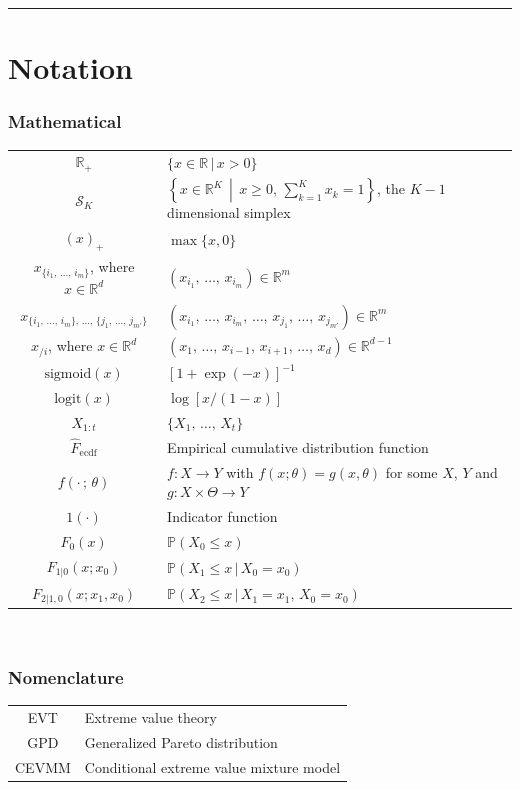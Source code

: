 \documentclass[11pt,twoside,openany]{book}
\newcommand{\prob}{\mathbb{P}}
\newcommand{\reals}{\mathbb{R}}
\numberwithin{Theorem}{chapter}
\numberwithin{Definition}{chapter}
\numberwithin{Lemma}{chapter}
\numberwithin{Algorithm}{chapter}
\numberwithin{equation}{chapter}
\begin{document}
\setcounter{page}{1}

\thispagestyle{plain}
\tableofcontents
\clearpage

\thispagestyle{plain}
\hrule
\chapter*{Notation}

\subsection*{Mathematical}
\begin{tabular}{cp{\textwidth}}
  $\reals_{+}$ & $\{x\in\reals\,|\,x > 0\}$ \\
  $\mathcal{S}_K$ & $\left\{x\in\reals^K\,\middle |\, x \geq 0,\,\sum_{k=1}^K x_k = 1\right\}$, the $K-1$ dimensional simplex \\
  $(x)_+$ & $\max\{x, 0\}$ \\
  $x_{\{i_1,\,\ldots,\,i_m\}}$, where $x\in\reals^d$ & $(x_{i_1},\,\ldots,\,x_{i_m})\in\reals^m$ \\
  $x_{\{i_1,\,\ldots,\,i_{m}\},\,\ldots,\,\{j_{1},\,\ldots,\,j_{m'}\}}$ & $(x_{i_1},\,\ldots,\,x_{i_m},\,\ldots,\,x_{j_{1}},\,\ldots,\,x_{j_{m'}})\in\reals^m$ \\
  $x_{/i}$, where $x\in\reals^d$ & $(x_1,\,\ldots,\,x_{i-1},\,x_{i+1},\,\ldots,\,x_d)\in\reals^{d-1}$ \\
  $\text{sigmoid}(x)$ & $[1 + \exp(-x)]^{-1}$ \\
  $\text{logit}(x)$ & $\log\left[x/(1-x)\right]$ \\
  $X_{1:t}$ & $\{X_1,\,\ldots,\,X_t\}$ \\
  $\hat F_{\text{ecdf}}$ & Empirical cumulative distribution function \\
  $f(\cdot\,;\,\theta)$ & $f:X\rightarrow Y$ with $f(x;\theta) = g(x,\theta)$ for some $X$, $Y$ and $g : X \times \Theta \rightarrow Y$\\
  $1(\cdot)$ & Indicator function\\
  $F_{0}(x)$ & $\prob(X_0 \leq x)$\\
  $F_{1|0}(x;x_0)$ & $\prob(X_1 \leq x\,|\, X_0 = x_0)$\\
  $F_{2|1,0}(x;x_1,x_0)$ & $\prob(X_2 \leq x\,|\,X_1=x_1,\, X_0= x_0)$\\
\end{tabular}\\
\subsection*{Nomenclature}
\begin{tabular}{cp{\textwidth}}
  EVT & Extreme value theory \\
  GPD & Generalized Pareto distribution \\
  CEVMM & Conditional extreme value mixture model
\end{tabular}\\
\end{document}
